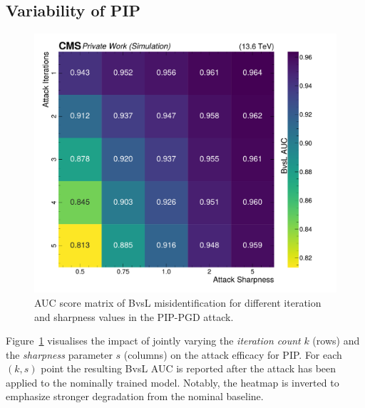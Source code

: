 \subsection{Variability of PIP}
\label{sec:intprob_variability}

\begin{figure}[h]
\centering
    \includegraphics[width=15cm]{media/output/sharpness_iterations_scan.pdf}
    \caption{AUC score matrix of BvsL misidentification for different iteration and sharpness values in the PIP-PGD attack.}
    \label{fig:joint_sharpness_vs_iterarions}
\end{figure}

Figure~\ref{fig:joint_sharpness_vs_iterarions} visualises the impact of jointly varying the \emph{iteration count} $k$ (rows) and the \emph{sharpness} parameter $s$ (columns) on the attack efficacy for PIP. For each $(k,s)$ point the resulting BvsL AUC is reported after the attack has been applied to the nominally trained model. Notably, the heatmap is inverted to emphasize stronger degradation from the nominal baseline.

\newpage
